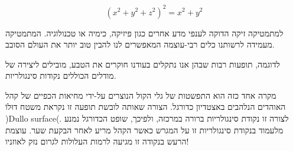 \documentclass{report}
\begin{document}

\[(x^2+ y^2+ z^2)^2	= x^2+ y^2\]


למתמטיקה זיקה הדוקה לענפי מדע אחרים כגון פיזיקה, כימיה או טכנולוגיה. המתמטיקה מעמידה לרשותנו כלים רבי-עוצמה המאפשרים לנו להבין טוב יותר את העולם הסובב. 

לדוגמה, תופעות רבות שבהן אנו נתקלים בעודנו חוקרים את הטבע, מובילים ליצירה של מודלים הכוללים נקודות סינגולריות.

מקרה אחד כזה הוא התפשטות של גלי הקול הנוצרים על-ידי מחיאות הכפיים של קהל האוהדים הנלהבים באצטדיון כדורגל. הצורה שאותה לובשת תופעה זו נקראת משטח דוּלוֹ )Dullo surface(. לצורה זו נקודת סינגולריות ברורה במרכזה, ולפיכך, שופט הכדורגל נמנע מלעמוד בנקודת סינגולריות זו על המגרש כאשר הקהל מריע לאחר הבקעת שער. עוצמת הרעש בנקודה זו מגיעה לרמות העלולות לגרום נזק לאוזניו!
\end{document}
